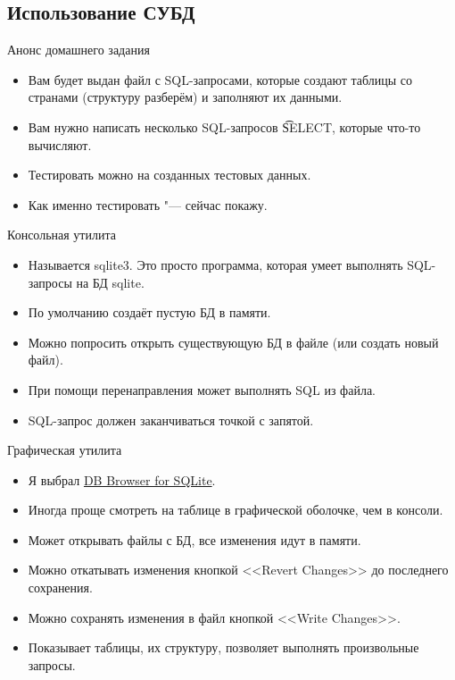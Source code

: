 \subsection{Использование СУБД}

\begin{frame}
\end{frame}

\begin{frame}{Анонс домашнего задания}
	\begin{itemize}
		\item Вам будет выдан файл с SQL-запросами, которые создают таблицы со странами (структуру разберём) и заполняют их данными.
		\item Вам нужно написать несколько SQL-запросов \t{SELECT}, которые что-то вычисляют.
		\item Тестировать можно на созданных тестовых данных.
		\item Как именно тестировать "--- сейчас покажу.
	\end{itemize}
\end{frame}

\begin{frame}{Консольная утилита}
	\begin{itemize}
		\item Называется sqlite3. Это просто программа, которая умеет выполнять SQL-запросы на БД sqlite.
		\item По умолчанию создаёт пустую БД в памяти.
		\item Можно попросить открыть существующую БД в файле (или создать новый файл).
		\item При помощи перенаправления может выполнять SQL из файла.
		\item SQL-запрос должен заканчиваться точкой с запятой.
	\end{itemize}
\end{frame}

\begin{frame}{Графическая утилита}
	\begin{itemize}
		\item Я выбрал \href{http://sqlitebrowser.org/}{DB Browser for SQLite}.
		\item Иногда проще смотреть на таблице в графической оболочке, чем в консоли.
		\item Может открывать файлы с БД, все изменения идут в памяти.
		\item Можно откатывать изменения кнопкой <<Revert Changes>> до последнего сохранения.
		\item Можно сохранять изменения в файл кнопкой <<Write Changes>>.
		\item Показывает таблицы, их структуру, позволяет выполнять произвольные запросы.
	\end{itemize}
\end{frame}
